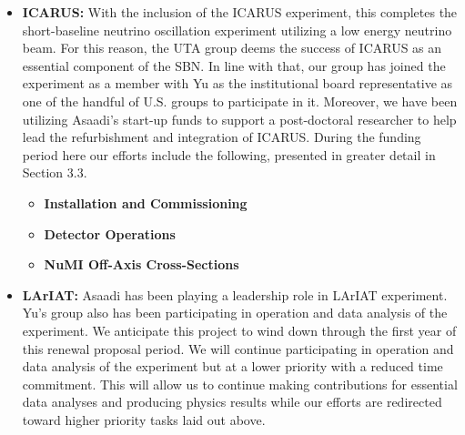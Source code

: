 \begin{itemize}
\begin{itemize}
\item{{\bf ICARUS:} With the inclusion of the ICARUS experiment, this completes the short-baseline neutrino oscillation experiment utilizing a low energy neutrino beam. For this reason, the UTA group deems the success of ICARUS as an essential component of the SBN. In line with that, our group has joined the experiment as a member with Yu as the institutional board representative as one of the handful of U.S. groups to participate in it. Moreover, we have been utilizing Asaadi's start-up funds to support a post-doctoral researcher to help lead the refurbishment and integration of ICARUS. During the funding period here our efforts include the following, presented in greater detail in Section 3.3.}

\begin{itemize}
\item{\textbf{Installation and Commissioning}}
\item{\textbf{Detector Operations}}
\item{\textbf{NuMI Off-Axis Cross-Sections}}

\end{itemize}


\item{{\bf LArIAT:} Asaadi has been playing a leadership role in LArIAT experiment.  Yu's group also has been participating in operation and data analysis of the experiment.   We anticipate this project to wind down through the first year of this renewal proposal period.  We will continue participating in operation and data analysis of the experiment but at a lower priority with a reduced time commitment.  This will allow us to continue making contributions for essential data analyses and producing physics results while our efforts are redirected toward higher priority tasks laid out above.}
\end{itemize}

\end{itemize}


